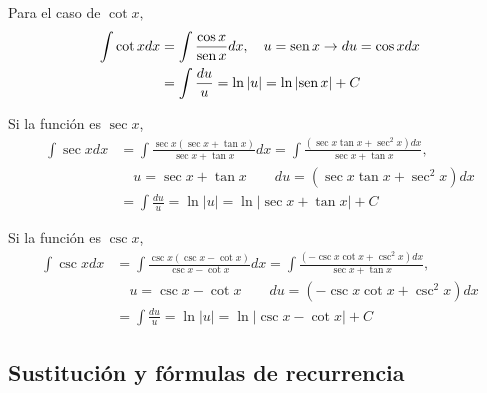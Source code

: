 


Para el caso de $\cot x,$
{\small
\begin{align*}
\int \cot xdx&=\int \frac{\cos x}{\text{\rm sen}\, x}dx,\quad u=\text{\rm sen}\, x \rightarrow du=\cos xdx\\
&=\int \frac{du}{u}=\ln \left\vert u\right\vert =\ln \left\vert \text{\rm sen}\,
x\right\vert +C
\end{align*}
}

Si la función es $\sec x$,
{\small
\begin{align*}
\int \sec xdx & =\int \frac{\sec x\left( \sec x+\tan x\right) }{\sec x+\tan x}dx =\int \frac{\left( \sec x\tan x+\sec ^{2}x\right) dx}{\sec x+\tan x},\\
&\quad u=\sec x+\tan x\qquad du=\left( \sec x\tan x+\sec ^{2}x\right) dx\\
&=\int \frac{du}{u}=\ln \left\vert u\right\vert =\ln \left\vert \sec x+\tan
x\right\vert +C
\end{align*}
}

Si la función es $\csc x$,
{\small
\begin{align*}
\int \csc xdx&=\int \frac{\csc x\left( \csc x-\cot x\right) }{\csc x-\cot x}dx=\int \frac{\left( -\csc x\cot x+\csc ^{2}x\right) dx}{\sec x+\tan x},\\
&\quad u=\csc x-\cot x\qquad du=\left( -\csc x\cot x+\csc ^{2}x\right) dx\\
&=\int \frac{du}{u}=\ln \left\vert u\right\vert =\ln \left\vert \csc x-\cot
x\right\vert +C
\end{align*}
}

\subsection*{Sustitución y fórmulas de recurrencia}

